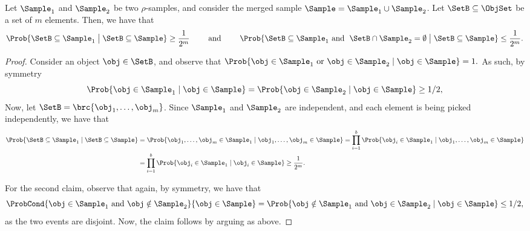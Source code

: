 \begin{lemma}
    Let $\Sample_1$ and $\Sample_2$ be two $\rho$-samples, and
    consider the merged sample $\Sample = \Sample_1 \cup
    \Sample_2$. Let $\SetB \subseteq \ObjSet$ be a set of $m$
    elements. Then, we have that
    \begin{align*}
      \Prob{ \Bigl. \SetB \subseteq \Sample_1 \bigm\vert{ \SetB \subseteq
      \Sample}} \geq \frac{1}{2^m}
      \qquad \text{ and } \qquad%
      \Prob{ \Bigl. \SetB \subseteq \Sample_1%
      \text{ and }\;
      \SetB \cap \Sample_2 = \emptyset \bigm\vert{ \SetB \subseteq \Sample}}
      \leq \frac{1}{2^m}.
    \end{align*}
\end{lemma}
\begin{proof}
    Consider an object $\obj \in \SetB$, and observe that
    \begin{math}
        \Prob{\bigl. \obj \in \Sample_1
           \text{ or }  \obj \in \Sample_2
           \mid \obj \in \Sample} = 1.%
    \end{math}
    As such, 
    by symmetry
    \begin{align*}
      \Prob{\bigl. \obj \in \Sample_1 \mid \obj \in \Sample}%
      =%
      \Prob{\bigl. \obj \in \Sample_2 \mid \obj \in \Sample}%
      \geq%
      1/2,
    \end{align*}    
    Now, let $\SetB = \brc{ \obj_1, \ldots, \obj_m}$. Since
    $\Sample_1$ and $\Sample_2$ are independent, and each element is
    being picked independently, we have that
    \begin{align*}
        \Prob{ \bigl. \SetB \subseteq \Sample_1 \mid{ \SetB \subseteq
        \Sample}}%
      &=%
        \Prob{ \bigl. \obj_1, \ldots, \obj_m  \in \Sample_1 \mid{
        \obj_1, \ldots, \obj_m \in \Sample}}
        =%
        \prod_{i=1}^b \Prob{ \bigl. \obj_i  \in \Sample_1 \mid{
        \obj_1, \ldots, \obj_m \in \Sample}}
      \\&%
          =%
          \prod_{i=1}^b \Prob{ \bigl. \obj_i  \in \Sample_1 \mid{
          \obj_i \in \Sample}}
          \geq%
          \frac{1}{2^m}.
    \end{align*}

    For the second claim, observe that again, by
    symmetry, we have that 
    \begin{equation*}
        \ProbCond{\bigl. \obj \in \Sample_1
           \text{ and }
           \obj \notin \Sample_2
        }{ \obj \in \Sample}%
        =%
      \Prob{\bigl. \obj \notin \Sample_1
      \text{ and } \obj \in \Sample_2
      \mid \obj \in \Sample}%
      \leq%
      1/2,
  \end{equation*}
    as the two events are disjoint. Now, the claim follows by arguing
    as above.
\end{proof}

